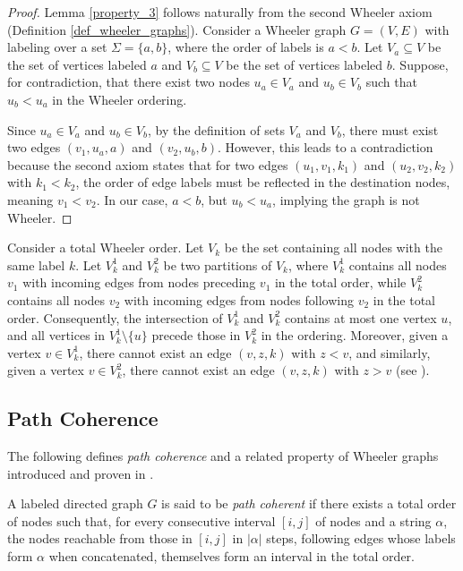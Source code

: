 \begin{proof}
    Lemma \ref{property_3} follows naturally from the second Wheeler axiom (Definition \ref{def_wheeler_graphs}). Consider a Wheeler graph $G=(V,E)$ with labeling over a set $\Sigma=\{a,b\}$, where the order of labels is $a<b$. Let $V_a \subseteq V$ be the set of vertices labeled $a$ and $V_b \subseteq V$ be the set of vertices labeled $b$. Suppose, for contradiction, that there exist two nodes $u_a \in V_a$ and $u_b \in V_b$ such that $u_b < u_a$ in the Wheeler ordering.
    
    Since $u_a \in V_a$ and $u_b \in V_b$, by the definition of sets $V_a$ and $V_b$, there must exist two edges $(v_1, u_a, a)$ and $(v_2, u_b, b)$. However, this leads to a contradiction because the second axiom states that for two edges $(u_1,v_1,k_1)$ and $(u_2,v_2,k_2)$ with $k_1<k_2$, the order of edge labels must be reflected in the destination nodes, meaning $v_1<v_2$. In our case, $a<b$, but $u_b < u_a$, implying the graph is not Wheeler.
\end{proof}

\begin{lemma} \label{property_4}
    Consider a total Wheeler order. Let $V_k$ be the set containing all nodes with the same label $k$. Let $V_k^1$ and $V_k^2$ be two partitions of $V_k$, where $V_k^1$ contains all nodes $v_1$ with incoming edges from nodes preceding $v_1$ in the total order, while $V_k^2$ contains all nodes $v_2$ with incoming edges from nodes following $v_2$ in the total order. Consequently, the intersection of $V_k^1$ and $V_k^2$ contains at most one vertex $u$, and all vertices in $V_k^1 \setminus \{u\}$ precede those in $V_k^2$ in the ordering. Moreover, given a vertex $v \in V_k^1$, there cannot exist an edge $(v, z, k)$ with $z<v$, and similarly, given a vertex $v \in V_k^2$, there cannot exist an edge $(v, z, k)$ with $z>v$ (see \cite{inapproximabilityWheelerGraphs}).
\end{lemma}

\subsection{Path Coherence}
The following defines \textit{path coherence} and a related property of Wheeler graphs introduced and proven in \cite{wheelerGrpahs}.

\begin{definition}
    A labeled directed graph $G$ is said to be \textit{path coherent} if there exists a total order of nodes such that, for every consecutive interval $[i, j]$ of nodes and a string $\alpha$, the nodes reachable from those in $[i, j]$ in $|\alpha |$ steps, following edges whose labels form $\alpha$ when concatenated, themselves form an interval in the total order.
\end{definition}

